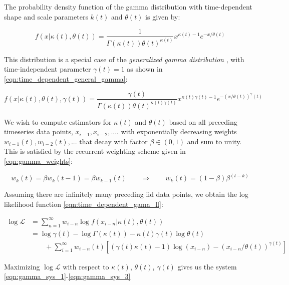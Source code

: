 \documentclass[12pt]{article}
\begin{document}
The probability density function of the gamma distribution with time-dependent shape and scale parameters $k(t)$ and $\theta(t)$ is given by:

\begin{equation}
f(x|\kappa(t), \theta(t)) = \frac{1}{\Gamma(\kappa(t))\theta(t)^{\kappa(t)}} x^{\kappa(t)-1}e^{-x/\theta(t)}
\label{eqn:time_dependent_gamma}
\end{equation}

\noindent This distribution is a special case of the \textit{generalized gamma distribution} \label{eqn:time_dependent_general_gamma}, with time-independent parameter $\gamma(t) = 1$ as shown in \eqref{eqn:time_dependent_general_gamma}:

\begin{equation}
f(x|\kappa(t), \theta(t), \gamma(t)) = \frac{\gamma(t)}{\Gamma(\kappa(t))\theta(t)^{\kappa(t)\gamma(t)}} x^{\kappa(t)\gamma(t)-1}e^{-(x/\theta(t))^\gamma(t)}
\end{equation}

\noindent We wish to compute estimators for $\kappa(t)$ and $\theta(t)$ based on all preceding timeseries data points, $x_{i-1}, x_{i-2}, ....$ with exponentially decreasing weights $w_{i-1}(t), w_{i-2}(t), ...$ that decay with factor $\beta \in (0, 1)$ and sum to unity. This is satisfied by the recurrent weighting scheme given in \eqref{eqn:gamma_weights}:

\begin{equation}
w_{k}(t) = \beta w_{k}(t-1) = \beta w_{k-1}(t) \qquad\Rightarrow\qquad w_{k}(t) = (1-\beta)\beta^{(t-k)}
\label{eqn:gamma_weights}
\end{equation} 

\noindent Assuming there are infinitely many preceding iid data points, we obtain the log likelihood function \eqref{eqn:time_dependent_gama_ll}:

\begin{align}
\log \mathcal{L} & = \sum_{n=1}^\infty w_{i-n}\log f(x_{i-n}|\kappa(t), \theta(t)) \nonumber\\
& = \log \gamma(t) - \log\Gamma(\kappa(t)) - \kappa(t)\gamma(t)\log \theta(t) \nonumber \\ 
& \qquad +\sum_{i=1}^\infty w_{i-n}(t)[(\gamma(t)\kappa(t) - 1)\log(x_{i-n}) - (x_{i-n}/\theta(t))^{\gamma(t)}]
\label{eqn:time_dependent_gama_ll}
\end{align}

\noindent Maximizing $\log\mathcal{L}$ with respect to $\kappa(t)$, $\theta(t)$, $\gamma(t)$ gives us the system \eqref{eqn:gamma_sys_1}-\eqref{eqn:gamma_sys_3}
\end{document}
